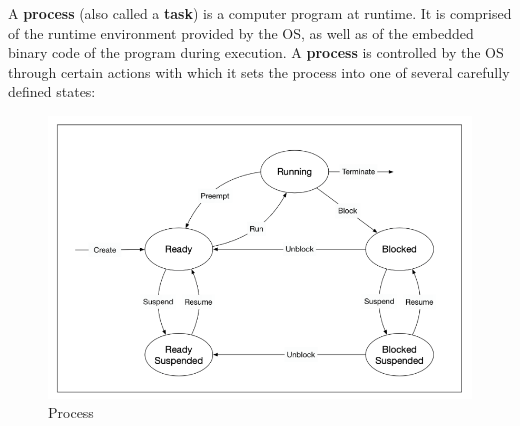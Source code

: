 \documentclass[11pt, a4paper]{article}
\begin{document}
A \textbf{process} (also called a \textbf{task}) is a computer program at runtime. It is comprised of the runtime environment provided by the OS, as well as of the embedded binary code of the program during execution. A \textbf{process} is controlled by the OS through certain actions with which it sets the process into one of several carefully defined states:



\begin{figure}[htpb!]
	\centering
	\includegraphics[width=0.8\linewidth]{process}
	\caption{Process}
	\label{fig:process}
\end{figure}
\end{document}
